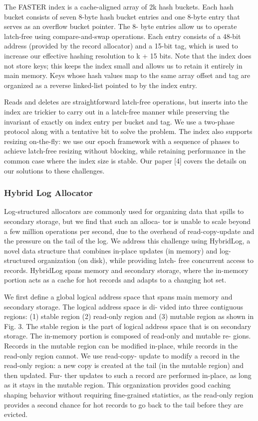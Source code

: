 {The FASTER index is a cache-aligned array of 2k hash buckets. Each hash
bucket consists of seven 8-byte hash bucket entries and one 8-byte entry
that serves as an overflow bucket pointer. The 8- byte entries allow us
to operate latch-free using compare-and-swap operations. Each entry
consists of a 48-bit address (provided by the record allocator) and a
15-bit tag, which is used to increase our effective hashing resolution
to k + 15 bits. Note that the index does not store keys; this keeps the
index small and allows us to retain it entirely in main memory. Keys
whose hash values map to the same array offset and tag are organized as
a reverse linked-list pointed to by the index entry.

Reads and deletes are straightforward latch-free operations, but inserts
into the index are trickier to carry out in a latch-free manner while
preserving the invariant of exactly on index entry per bucket and tag.
We use a two-phase protocol along with a tentative bit to solve the
problem. The index also supports resizing on-the-fly: we use our epoch
framework with a sequence of phases to achieve latch-free resizing
without blocking, while retaining performance in the common case where
the index size is stable. Our paper [4] covers the details on our
solutions to these challenges.

\subsubsection{Hybrid Log Allocator}

Log-structured allocators are commonly used for organizing data that
spills to secondary storage, but we find that such an alloca- tor is
unable to scale beyond a few million operations per second, due to the
overhead of read-copy-update and the pressure on the tail of the log. We
address this challenge using HybridLog, a novel data structure that
combines in-place updates (in memory) and log-structured organization
(on disk), while providing latch- free concurrent access to records.
HybridLog spans memory and secondary storage, where the in-memory
portion acts as a cache for hot records and adapts to a changing hot
set.

We first define a global logical address space that spans main memory
and secondary storage. The logical address space is di- vided into three
contiguous regions: (1) stable region (2) read-only region and (3)
mutable region as shown in Fig. 3. The stable region is the part of
logical address space that is on secondary storage. The in-memory
portion is composed of read-only and mutable re- gions. Records in the
mutable region can be modified in-place, while records in the read-only
region cannot. We use read-copy- update to modify a record in the
read-only region: a new copy is created at the tail (in the mutable
region) and then updated. Fur- ther updates to such a record are
performed in-place, as long as it stays in the mutable region. This
organization provides good caching shaping behavior without requiring
fine-grained statistics, as the read-only region provides a second
chance for hot records to go back to the tail before they are evicted.

}

